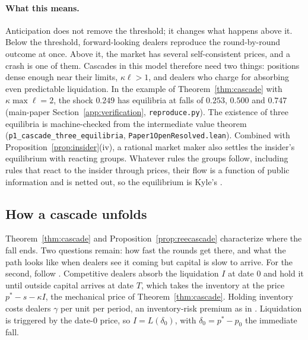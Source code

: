 \documentclass[12pt]{article}
\theoremstyle{definition}
\theoremstyle{remark}
\begin{document}
\paragraph{What this means.} Anticipation does not remove the threshold; it changes what happens above it. Below the threshold, forward-looking dealers reproduce the round-by-round outcome at once. Above it, the market has several self-consistent prices, and a crash is one of them. Cascades in this model therefore need two things: positions dense enough near their limits, $\kappa\ell>1$, and dealers who charge for absorbing even predictable liquidation. In the example of Theorem~\ref{thm:cascade} with $\kappa\max\ell=2$, the shock $0.249$ has equilibria at falls of $0.253$, $0.500$ and $0.747$ (main-paper Section~\ref{app:verification}, \nolinkurl{reproduce.py}). The existence of three equilibria is machine-checked from the intermediate value theorem (\texttt{p1\_cascade\_three\_equilibria}, \nolinkurl{Paper1OpenResolved.lean}). Combined with Proposition~\ref{prop:insider}(iv), a rational market maker also settles the insider's equilibrium with reacting groups. Whatever rules the groups follow, including rules that react to the insider through prices, their flow is a function of public information and is netted out, so the equilibrium is Kyle's \citep{kyle1985}.

\subsection{How a cascade unfolds}

Theorem~\ref{thm:cascade} and Proposition~\ref{prop:reecascade} characterize where the fall ends. Two questions remain: how fast the rounds get there, and what the path looks like when dealers see it coming but capital is slow to arrive. For the second, follow \citet{duffie2010}. Competitive dealers absorb the liquidation $I$ at date $0$ and hold it until outside capital arrives at date $T$, which takes the inventory at the price $p^*-s-\kappa I$, the mechanical price of Theorem~\ref{thm:cascade}. Holding inventory costs dealers $\gamma$ per unit per period, an inventory-risk premium as in \citet{grossman1988}. Liquidation is triggered by the date-$0$ price, so $I=L(\delta_0)$, with $\delta_0=p^*-p_0$ the immediate fall.
\end{document}
